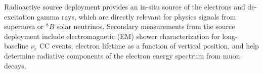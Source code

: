 Radioactive source deployment provides an in-situ source of the electrons and de-excitation gamma rays, which are directly relevant for physics signals from supernova or $^{8}B$ solar neutrinos. Secondary measurements from the source deployment include electromagnetic (EM) shower characterization for long-baseline $\nu_e$ CC events, electron lifetime as a function of  vertical position, and help determine radiative components of the electron energy spectrum from muon decays.




